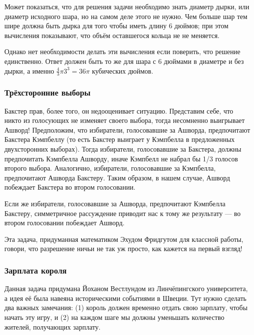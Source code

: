 Может показаться, что для решения задачи необходимо знать диаметр дырки, или диаметр исходного шара, но на самом деле этого не нужно.
Чем больше шар тем шире должна быть дырка для того чтобы иметь длину 6 дюймов;
при этом вычисления показывают, что объём оставшегося кольца не не меняется.

Однако нет необходимости делать эти вычисления если поверить, что решение единственно.
Ответ должен быть то же для шара с 6 дюймами в диаметре и без дырки, а именно $\tfrac43\pi3^3=36\pi$ кубических дюймов.


\subsubsection*{Трёхсторонние выборы}%

Бакстер прав, более того, он недооценивает ситуацию.
Представим себе, что никто из голосующих не изменяет своего выбора, тогда несомненно выигрывает Ашворд!
Предположим, что избиратели, голосовавшие за Ашворда, предпочитают Бакстера Кэмпбеллу (то есть Бакстер выиграет у Кэмпбелла в предложенных двухсторонних выборах).
Тогда избиратели, голосовавшие за Бакстера, должны предпочитать
Кэмпбелла Ашворду, иначе Кэмпбелл не набрал бы 1/3 голосов второго выбора.
Аналогично, избиратели, голосовавшие за Кэмпбелла, предпочитают Ашворда
Бакстеру.
Таким образом, в нашем случае, Ашворд побеждает Бакстера во втором
голосовании.

Если же избиратели, голосовавшие за Ашворда, предпочитают Кэмпбелла Бакстеру, симметричное рассуждение приводит нас к тому же результату --- во втором голосовании побеждает Ашворд.
\heart

Эта задача, придуманная математиком Эхудом Фридгутом %
для классной работы, говори, что разрешение ничьи не так уж просто, как кажется на первый взгляд!%

\subsubsection*{Зарплата короля}%

Данная задача придумана Йоханом Вестлундом %
из Линчёпингского университета, а идея её была навеяна историческими событиями в Швеции.
Тут нужно сделать два важных замечания: (1) король должен временно отдать свою зарплату, чтобы начать эту игру, и (2) на каждом шаге мы должны уменьшать количество жителей, получающих зарплату.

